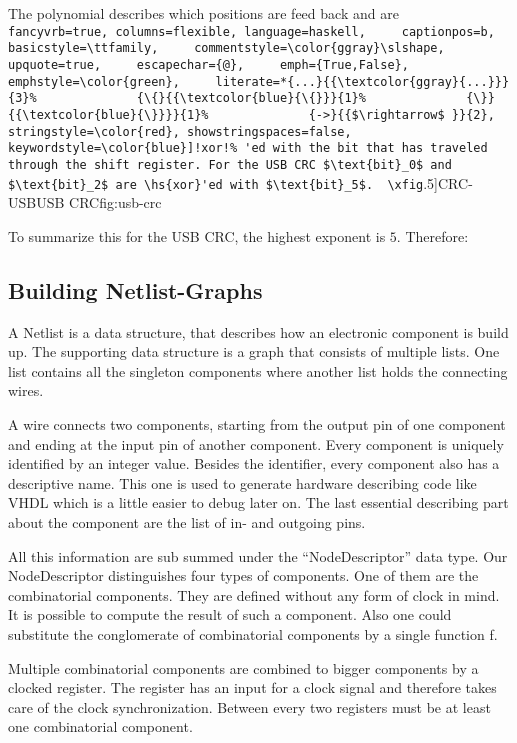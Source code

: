 \documentclass[a4paper]{llncs}
\makeatletter
\newcommand{\hs}[1]{%
  \lstinline[
    fancyvrb=true, columns=flexible, language=haskell,
    captionpos=b,
    basicstyle=\ttfamily,
    commentstyle=\color{ggray}\slshape,
    upquote=true,
    escapechar={@},
    emph={True,False}, emphstyle=\color{green},
    literate=*{...}{{\textcolor{ggray}{...}}}{3}%
             {\{}{{\textcolor{blue}{\{}}}{1}%
             {\}}{{\textcolor{blue}{\}}}}{1}%
             {->}{{$\rightarrow$ }}{2},
    stringstyle=\color{red}, showstringspaces=false,
    keywordstyle=\color{blue}]!#1!%
}
\newcommand{\xfig}[4][0.9] {%
    \begin{figure}[ht]
        \begin{center}
            \graphicspath{{./}{Images/}}
            \scalebox{#1}{%
                
            }
            \caption{\label{#4} #3}
        \end{center}
    \end{figure}
}
\makeatother
\begin{document}
The polynomial describes which positions are feed back and are \hs{xor}'ed with the bit that has traveled through the shift
register. For the USB CRC $\text{bit}_0$ and $\text{bit}_2$ are \hs{xor}'ed with $\text{bit}_5$.

\xfig[.5]{CRC-USB}{USB CRC}{fig:usb-crc}

To summarize this for the USB CRC, the highest exponent is $5$. Therefore:



\subsection{Building Netlist-Graphs}
A Netlist is a data structure, that describes how an electronic component is build up. The supporting data structure is a graph
that consists of multiple lists. One list contains all the singleton components where another list holds the connecting wires. 

A wire connects two components, starting from the output pin of one component and ending at the input pin of another
component. Every component is uniquely identified by an integer value. Besides the identifier, every component also has a
descriptive name. This one is used to generate hardware describing code like VHDL which is a little easier to debug later on. The
last essential describing part about the component are the list of in- and outgoing pins. 

All this information are sub summed under the ``NodeDescriptor'' data type. Our NodeDescriptor distinguishes four types of
components. One of them are the combinatorial components. They are defined without any form of clock in mind. It is possible to
compute the result of such a component. Also one could substitute the conglomerate of combinatorial components by a single
function f. 

Multiple combinatorial components are combined to bigger components by a clocked register. The register has an input for a clock
signal and therefore takes care of the clock synchronization. Between every two registers must be at least one combinatorial
component.
\end{document}
